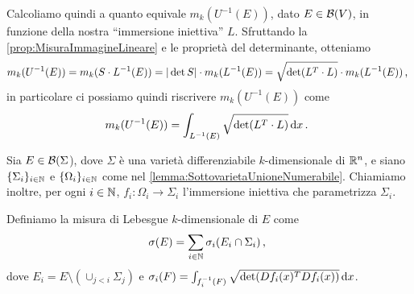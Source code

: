 Calcoliamo quindi a quanto equivale $m_k(U^{-1}(E))$, dato $E\in\mathcal B(V)$, in funzione della nostra ``immersione iniettiva'' $L$. Sfruttando la \cref{prop:MisuraImmagineLineare} e le proprietà del determinante, otteniamo
\begin{equation*}
	m_k(U^{-1}(E))=m_k(S\cdot L^{-1}(E))=|\det S |\cdot m_k(L^{-1}(E))=\sqrt{\det(L^T\cdot L)}\cdot m_k(L^{-1}(E))\, \text{, }
\end{equation*}
in particolare ci possiamo quindi riscrivere $m_k(U^{-1}(E))$ come
\begin{equation*}
	m_k(U^{-1}(E))=\int_{L^{-1}(E)}\sqrt{\det(L^T\cdot L)}\,\mathrm d x\, \text{. }
\end{equation*}



\begin{definition}\label{def:MisuraKDimensionale}
	Sia $E\in\mathcal B(\Sigma$), dove $\Sigma$ è una varietà differenziabile $k$-dimensionale di $\mathbb R^n$, e siano $\{\Sigma_i\}_{i\in\mathbb N}$ e $\{\Omega_i\}_{i\in\mathbb N}$ come nel \cref{lemma:SottovarietaUnioneNumerabile}. Chiamiamo inoltre, per ogni $i\in\mathbb N$, $f_i:\Omega_i\to\Sigma_i$ l'immersione iniettiva che parametrizza $\Sigma_i$.
	
	Definiamo la misura di Lebesgue $k$-dimensionale di $E$ come
	\begin{equation*}
		\sigma(E)=\sum_{i\in\mathbb N} \sigma_i(E_i\cap \Sigma_i)\, \text{, }
	\end{equation*}
	dove $E_i=E\setminus (\cup_{j<i}\Sigma_j)$ e $\sigma_i(F)=\int_{f_i^{-1}(F)}\sqrt{\det(Df_i(x)^TDf_i(x))} \,\mathrm d x$.
\end{definition}

